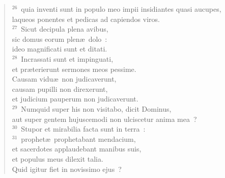 \begin{flushleft}
\begin{verse}
${}^{26}$~quia inventi sunt in populo meo impii insidiantes quasi aucupes,\\ laqueos ponentes et pedicas ad capiendos viros.\\
${}^{27}$~Sicut decipula plena avibus,\\ sic domus eorum plen\ae\ dolo~:\\ ideo magnificati sunt et ditati.\\
${}^{28}$~Incrassati sunt et impinguati,\\ et pr\ae terierunt sermones meos pessime.\\ Causam vidu\ae\ non judicaverunt,\\ causam pupilli non direxerunt,\\ et judicium pauperum non judicaverunt.\\
${}^{29}$~Numquid super his non visitabo, dicit Dominus,\\ aut super gentem hujuscemodi non ulciscetur anima mea~?\\
${}^{30}$~Stupor et mirabilia facta sunt in terra~:\\
${}^{31}$~prophet\ae\ prophetabant mendacium,\\ et sacerdotes applaudebant manibus suis,\\ et populus meus dilexit talia.\\ Quid igitur fiet in novissimo ejus~?\end{verse}\end{flushleft}


